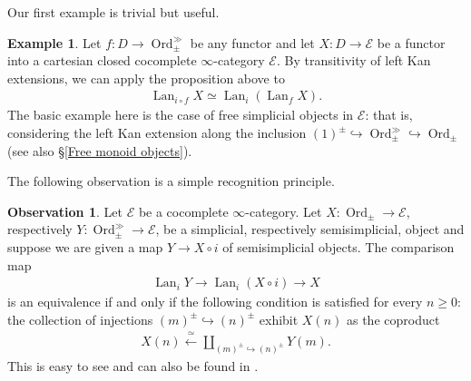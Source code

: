 \documentclass[12pt, reqno]{amsart}
\theoremstyle{plain}
\theoremstyle{definition}
\newtheorem{example}[theorem]{Example}
\newtheorem{observation}[theorem]{Observation}
\begin{document}
Our first example is trivial but useful.

\begin{example}
Let $f\colon D\rightarrow \operatorname{Ord}_\pm^\gg$ be any functor and let $X\colon D\rightarrow \mathcal{E}$ be a functor into a cartesian closed cocomplete $\infty$-category $\mathcal{E}$. By transitivity of left Kan extensions, we can apply the proposition above to
\begin{align*}
\operatorname{Lan}_{i\circ f}X \simeq \operatorname{Lan}_i(\operatorname{Lan}_f X).
\end{align*}
The basic example here is the case of free simplicial objects in $\mathcal{E}$: that is, considering the left Kan extension along the inclusion $(1)^\pm\hookrightarrow \operatorname{Ord}_\pm^\gg\hookrightarrow \operatorname{Ord}_\pm$ (see also \S \ref{Free monoid objects}).
\end{example}

The following observation is a simple recognition principle.

\begin{observation}
Let $\mathcal{E}$ be a cocomplete $\infty$-category. Let $X\colon \operatorname{Ord}_\pm\rightarrow \mathcal{E}$, respectively $Y\colon \operatorname{Ord}_\pm^\gg\rightarrow \mathcal{E}$, be a simplicial, respectively semisimplicial, object and suppose we are given a map $Y\rightarrow X\circ i$ of semisimplicial objects. The comparison map
\begin{align*}
\operatorname{Lan}_i Y\rightarrow \operatorname{Lan}_i (X\circ i)\rightarrow X
\end{align*}
is an equivalence if and only if the following condition is satisfied for every $n\geq 0$: the collection of injections $(m)^\pm \hookrightarrow (n)^\pm$ exhibit $X(n)$ as the coproduct
\begin{align*}
X(n)\xleftarrow{ \ \simeq \ } \coprod_{(m)^\pm \hookrightarrow (n)^\pm}Y(m).
\end{align*}
This is easy to see and can also be found in \cite[Remark 10.1.2.30]{kerodon}.
\end{observation}
\end{document}
